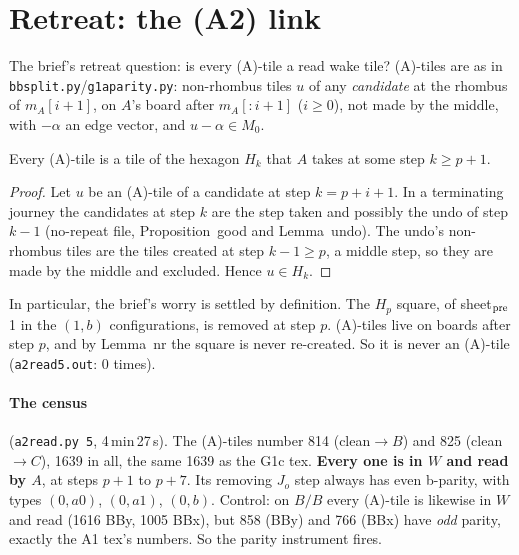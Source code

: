 \documentclass[11pt]{article}
\theoremstyle{definition}\newtheorem{definition}[theorem]{Definition}\newtheorem{remark}[theorem]{Remark}
\begin{document}
\section{Retreat: the (A2) link}\label{sec:a2}
The brief's retreat question: is every (A)-tile a read wake tile? (A)-tiles are as in \texttt{bbsplit.py}/\texttt{g1aparity.py}: non-rhombus tiles $u$ of any \emph{candidate} at the rhombus of $m_A[i+1]$, on $A$'s board after $m_A[{:}i+1]$ ($i\ge0$), not made by the middle, with $-\alpha$ an edge vector, and $u-\alpha\in M_0$.
\begin{lemma}\label{lem:aread}
Every (A)-tile is a tile of the hexagon $H_k$ that $A$ takes at some step $k\ge p+1$.
\end{lemma}
\begin{proof}
Let $u$ be an (A)-tile of a candidate at step $k=p+i+1$. In a terminating journey the candidates at step $k$ are the step taken and possibly the undo of step $k-1$ (no-repeat file, Proposition~good and Lemma~undo). The undo's non-rhombus tiles are the tiles created at step $k-1\ge p$, a middle step, so they are made by the middle and excluded. Hence $u\in H_k$.
\end{proof}
\noindent In particular, the brief's worry is settled by definition. The $H_p$ square, of sheet$_{\rm pre}$ 1 in the $(1,b)$ configurations, is removed at step $p$. (A)-tiles live on boards after step $p$, and by Lemma~nr the square is never re-created. So it is never an (A)-tile (\texttt{a2read5.out}: 0 times).

\paragraph{The census} (\texttt{a2read.py 5}, 4\,min\,27\,s). The (A)-tiles number 814 (clean$\to B$) and 825 (clean$\to C$), 1639 in all, the same 1639 as the G1c tex. \textbf{Every one is in $W$ and read by $A$}, at steps $p+1$ to $p+7$. Its removing $J_o$ step always has even b-parity, with types $(0,a0)$, $(0,a1)$, $(0,b)$. Control: on $B/B$ every (A)-tile is likewise in $W$ and read (1616 BBy, 1005 BBx), but 858 (BBy) and 766 (BBx) have \emph{odd} parity, exactly the A1 tex's numbers. So the parity instrument fires.
\end{document}
